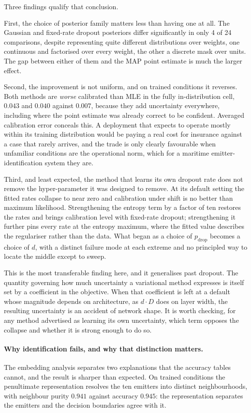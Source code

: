 \documentclass{article}
\begin{document}
Three findings qualify that conclusion.

First, the choice of posterior family matters less than having one at all. The
Gaussian and fixed-rate dropout posteriors differ significantly in only 4 of 24
comparisons, despite representing quite different distributions over weights,
one continuous and factorised over every weight, the other a discrete mask over
units. The gap between either of them and the MAP point estimate is much the
larger effect.

Second, the improvement is not uniform, and on trained conditions it reverses.
Both methods are \emph{worse} calibrated than MLE in the fully in-distribution
cell, $0.043$ and $0.040$ against $0.007$, because they add uncertainty
everywhere, including where the point estimate was already correct to be
confident. Averaged calibration error conceals this. A deployment that expects
to operate mostly within its training distribution would be paying a real cost
for insurance against a case that rarely arrives, and the trade is only clearly
favourable when unfamiliar conditions are the operational norm, which for a
maritime emitter-identification system they are.

Third, and least expected, the method that learns its own dropout rate does not
remove the hyper-parameter it was designed to remove. At its default setting the
fitted rates collapse to near zero and calibration under shift is no better than
maximum likelihood. Strengthening the entropy term by a factor of ten restores
the rates and brings calibration level with fixed-rate dropout; strengthening it
further pins every rate at the entropy maximum, where the fitted value describes
the regulariser rather than the data. What began as a choice of $p_{\text{drop}}$
becomes a choice of $d$, with a distinct failure mode at each extreme and no
principled way to locate the middle except to sweep.

This is the most transferable finding here, and it generalises past dropout. The
quantity governing how much uncertainty a variational method expresses is itself
set by a coefficient in the objective. When that coefficient is left at a
default whose magnitude depends on architecture, as $d \cdot D$ does on layer
width, the resulting uncertainty is an accident of network shape. It is worth
checking, for any method advertised as learning its own uncertainty, which term
opposes the collapse and whether it is strong enough to do so.

\paragraph{Why identification fails, and why that distinction matters.}
The embedding analysis separates two explanations that the accuracy tables
cannot, and the result is sharper than expected. On trained conditions the
penultimate representation resolves the ten emitters into distinct
neighbourhoods, with neighbour purity $0.941$ against accuracy $0.945$: the
representation separates the emitters and the decision boundaries agree with it.
\end{document}
